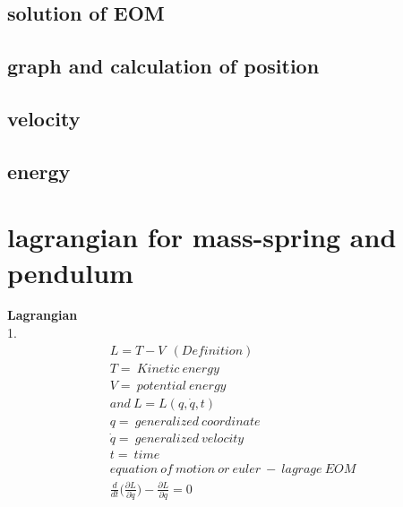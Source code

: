 \subsection{solution of EOM}



\subsection{graph and calculation of position}



\subsection{velocity}



\subsection{energy}



\section{lagrangian for mass-spring and pendulum}

	\textbf{Lagrangian}	\\
	1.
	\begin{align}
		L = T - V \ \ (Definition)\\
		T = \ Kinetic \ energy \\
		V = \ potential \ energy \\
		and \ L = L(q,\dot{q}, t) \\
		q = \ generalized \ coordinate \\
		\dot{q} = \ generalized \ velocity \\
		t = \ time \\ 
		equation \ of \ motion \ or \ euler \ - \ lagrage \ EOM \\
		\frac{d}{dt}\bigg(\frac{\partial L}{\partial \dot{q}}\bigg) - \frac{\partial L}{\partial q} = 0 \\
	\end{align}
	
